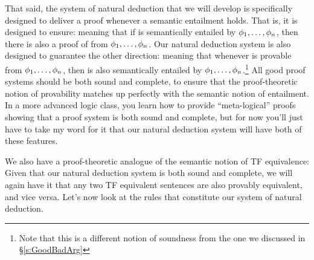 That said, the system of natural deduction that we will develop is specifically designed to deliver a proof whenever a semantic entailment holds.  That is, it is designed to ensure:
meaning that if \meta{\psi} is semantically entailed by $\mathcal{\phi}_1, \ldots, \mathcal{\phi}_n$, then there is also a proof of \meta{\psi} from $\mathcal{\phi}_1, \ldots, \mathcal{\phi}_n$.    Our natural deduction system is also designed to guarantee the other direction:
meaning that whenever \meta{\psi} is provable from $\mathcal{\phi}_1, \ldots, \mathcal{\phi}_n$, then \meta{\psi} is also semantically entailed by $\mathcal{\phi}_1, \ldots, \mathcal{\phi}_n$.\footnote{Note that this is a different notion of soundness from the one we discussed in \S \ref{s:GoodBadArg}}  All good proof systems should be both sound and complete, to ensure that the proof-theoretic notion of provability matches up perfectly with the semantic notion of entailment. In a more advanced logic class, you learn how to provide ``meta-logical'' proofs showing that a proof system is both sound and complete, but for now you'll just have to take my word for it that our natural deduction system will have both of these features.

We also have a proof-theoretic analogue of the semantic notion of TF equivalence:
Given that our natural deduction system is both sound and complete, we will again have it that any two TF equivalent sentences are also provably equivalent, and vice versa.  Let's now look at the rules that constitute our system of natural deduction.







